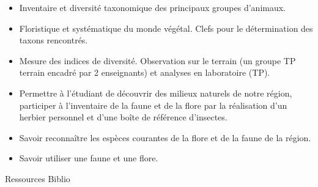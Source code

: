 \documentclass[10pt, a5paper]{report}
\begin{document}
{
\begin{itemize}
\item Inventaire et diversité taxonomique des principaux groupes d'animaux.
\item Floristique et systématique du monde végétal. Clefs pour le détermination des taxons rencontrés.
\item Mesure des indices de diversité. Observation sur le terrain (un groupe TP terrain encadré par 2 enseignants) et analyses en laboratoire (TP).
\end{itemize}
}
{}
{
\begin{itemize}
\item Permettre à l'étudiant de découvrir des milieux naturels de notre région, participer à l'inventaire de la faune et de la flore par la réalisation d'un herbier personnel et d'une boîte de référence d'insectes. 
\item Savoir reconnaître les espèces courantes de la flore et de la faune de la région. 
\item Savoir utiliser une faune et une flore.
\end{itemize}
} 
{Ressources} 
{Biblio} 

\vfill

\end{document}
